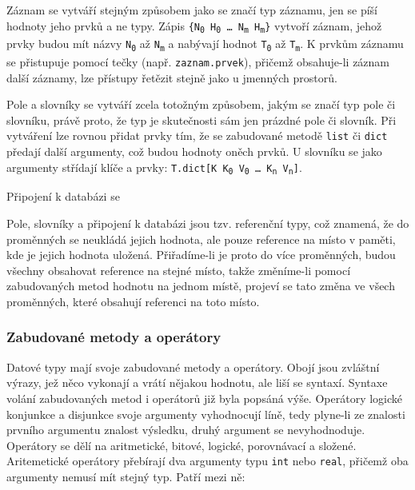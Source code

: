 \documentclass[a4paper,12pt]{article}
\begin{document}
Záznam se vytváří stejným způsobem jako se značí typ záznamu, jen se píší hodnoty jeho prvků a ne typy. Zápis \texttt{\{N\textsubscript{0} H\textsubscript{0} \ldots{} N\textsubscript{m} H\textsubscript{m}\}} vytvoří záznam, jehož prvky budou mít názvy \texttt{N\textsubscript{0}} až \texttt{N\textsubscript{m}} a nabývají hodnot \texttt{T\textsubscript{0}} až \texttt{T\textsubscript{m}}. K prvkům záznamu se přistupuje pomocí tečky (např. \texttt{zaznam.prvek}), přičemž obsahuje-li záznam další záznamy, lze přístupy řetězit stejně jako u jmenných prostorů.

Pole a slovníky se vytváří zcela totožným způsobem, jakým se značí typ pole či slovníku, právě proto, že typ je skutečnosti sám jen prázdné pole či slovník. Při vytváření lze rovnou přidat prvky tím, že se zabudované metodě \texttt{list} či \texttt{dict} předají další argumenty, což budou hodnoty oněch prvků. U slovníku se jako argumenty střídají klíče a prvky: \texttt{T.dict[K K\textsubscript{0} V\textsubscript{0} \ldots{} K\textsubscript{n} V\textsubscript{n}]}.

Připojení k databázi se 

Pole, slovníky a připojení k databázi jsou tzv. referenční typy, což znamená, že do proměnných se neukládá jejich hodnota, ale pouze reference na místo v paměti, kde je jejich hodnota uložená. Přiřadíme-li je proto do více proměnných, budou všechny obsahovat reference na stejné místo, takže změníme-li pomocí zabudovaných metod hodnotu na jednom místě, projeví se tato změna ve všech proměnných, které obsahují referenci na toto místo.

\subsubsection{Zabudované metody a operátory}
Datové typy mají svoje zabudované metody a operátory. Obojí jsou zvláštní výrazy, jež něco vykonají a vrátí nějakou hodnotu, ale liší se syntaxí. Syntaxe volání zabudovaných metod i operátorů již byla popsáná výše. Operátory logické konjunkce a disjunkce svoje argumenty vyhodnocují líně, tedy plyne-li ze znalosti prvního argumentu znalost výsledku, druhý argument se nevyhodnoduje. Operátory se dělí na aritmetické, bitové, logické, porovnávací a složené. Aritemetické operátory přebírají dva argumenty typu \texttt{int} nebo \texttt{real}, přičemž oba argumenty nemusí mít stejný typ. Patří mezi ně:
\end{document}
